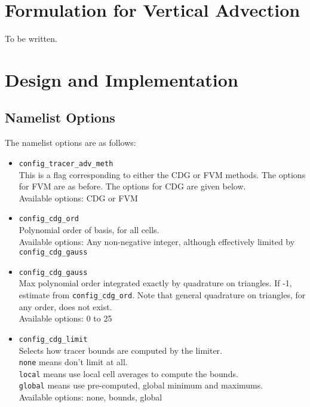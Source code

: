 \documentclass[11pt]{report}
\begin{document}
\chapter{Formulation for Vertical Advection}

To be written.

\chapter{Design and Implementation}

\section{Namelist Options}

The namelist options are as follows:
\begin{itemize}
\item {\tt config\_tracer\_adv\_meth}\\ This is a flag corresponding to either
  the CDG or FVM methods.  The options for FVM are as before.   The options
  for CDG are given below.\\
  Available options: CDG or FVM
\item {\tt config\_cdg\_ord}\\
  Polynomial order of basis, for all cells.\\
  Available options: Any non-negative integer, although effectively limited by
  {\tt config\_cdg\_gauss} 
\item {\tt config\_cdg\_gauss}\\
  Max polynomial order integrated exactly by
  quadrature on triangles.  If -1, estimate from {\tt config\_cdg\_ord}. Note
  that general quadrature on triangles, for any order, does not exist.\\
  Available options: 0 to 25
\item {\tt config\_cdg\_limit}\\
  Selects how tracer bounds are computed by the limiter.\\
  {\tt none} means don't limit at all.\\
  {\tt local} means use local cell averages to compute the bounds.\\
  {\tt global} means use pre-computed, global minimum and maximums.\\
  Available options: none, bounds, global
\end{itemize}
\end{document}
